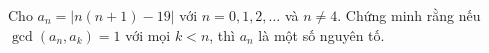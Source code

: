 \ifshowproblem
\begin{problem}\label{example:POL-2015-MO2-P3}
    Cho \( a_n = |n(n+1) - 19| \) với \( n = 0, 1, 2, \ldots \) và \( n \ne 4 \).
    Chứng minh rằng nếu \( \gcd(a_n, a_k) = 1 \) với mọi \( k < n \), thì \( a_n \) là một số nguyên tố.
\end{problem}
\fi

\footnotemark
{}
\fi
